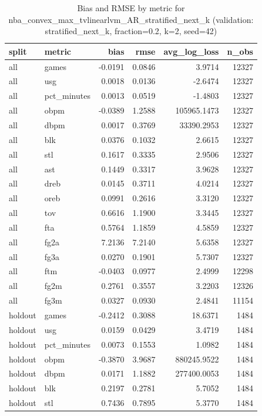 \begin{table}
\caption{Bias and RMSE by metric for nba_convex_max_tvlinearlvm_AR_stratified_next_k (validation: stratified_next_k, fraction=0.2, k=2, seed=42)}
\label{tab:nba_convex_max_tvlinearlvm_AR_stratified_next_k_vs_stratified_next_k_f20_k2_s42_bias_rmse}
\begin{tabular}{llrrrr}
\toprule
split & metric & bias & rmse & avg\_log\_loss & n\_obs \\
\midrule
all & games & -0.0191 & 0.0846 & 3.9714 & 12327 \\
all & usg & 0.0018 & 0.0136 & -2.6474 & 12327 \\
all & pct\_minutes & 0.0013 & 0.0519 & -1.4803 & 12327 \\
all & obpm & -0.0389 & 1.2588 & 105965.1473 & 12327 \\
all & dbpm & 0.0017 & 0.3769 & 33390.2953 & 12327 \\
all & blk & 0.0376 & 0.1032 & 2.6615 & 12327 \\
all & stl & 0.1617 & 0.3335 & 2.9506 & 12327 \\
all & ast & 0.1449 & 0.3317 & 3.9628 & 12327 \\
all & dreb & 0.0145 & 0.3711 & 4.0214 & 12327 \\
all & oreb & 0.0991 & 0.2616 & 3.3120 & 12327 \\
all & tov & 0.6616 & 1.1900 & 3.3445 & 12327 \\
all & fta & 0.5764 & 1.1859 & 4.5859 & 12327 \\
all & fg2a & 7.2136 & 7.2140 & 5.6358 & 12327 \\
all & fg3a & 0.0270 & 0.1901 & 5.7307 & 12327 \\
all & ftm & -0.0403 & 0.0977 & 2.4999 & 12298 \\
all & fg2m & 0.2761 & 0.3557 & 3.2203 & 12326 \\
all & fg3m & 0.0327 & 0.0930 & 2.4841 & 11154 \\
holdout & games & -0.2412 & 0.3088 & 18.6371 & 1484 \\
holdout & usg & 0.0159 & 0.0429 & 3.4719 & 1484 \\
holdout & pct\_minutes & 0.0073 & 0.1553 & 1.0982 & 1484 \\
holdout & obpm & -0.3870 & 3.9687 & 880245.9522 & 1484 \\
holdout & dbpm & 0.0171 & 1.1882 & 277400.0053 & 1484 \\
holdout & blk & 0.2197 & 0.2781 & 5.7052 & 1484 \\
holdout & stl & 0.7436 & 0.7895 & 5.3770 & 1484 \\

\end{tabular}
\end{table}
